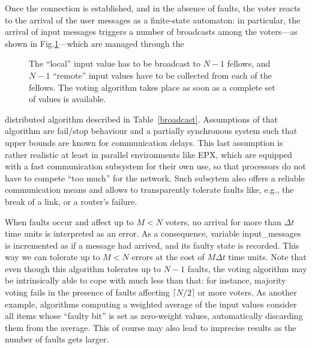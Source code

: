 \documentclass[11pt]{article}
\newcommand{\ceil}[1]{{\lceil{#1}\rceil}}
\begin{document}
Once the connection is established, and in the absence of faults,
the voter reacts to the arrival of 
the user messages as a finite-state automaton: in particular, the arrival of
input messages triggers a number of broadcasts among the voters---as shown
in Fig.\ref{vf}---which are managed through the 
\begin{figure}
\centerline{}
\caption{The ``local'' input value has to be broadcast to $N-1$ fellows,
and $N-1$ ``remote'' input values have to be collected from each of the
fellows. The voting algorithm takes place as soon as a complete set of values is
available.}\label{vf}
\end{figure}
distributed algorithm described in Table~\ref{broadcast}.
Assumptions of that algorithm are fail/stop behaviour and a partially
synchronous system such that upper bounds are known for communication delays.
This last assumption is rather realistic at least in parallel environments like EPX,
which are equipped with a fast communication subsystem for their own use,
so that processors do not have to compete ``too much'' for the network.
Such subsytem also offers a reliable communication means and allows to transparently tolerate 
faults like, e.g., the break of a link, or a router's failure.

When faults occur and affect up to $M<N$ voters,
no arrival for more than $\Delta t$ time units is interpreted
as an error. As a consequence, 
variable {\sf input\_messages} is incremented as if a message
had arrived, and its faulty state is recorded. This way we can tolerate
up to $M<N$ errors at the cost of $M\Delta t$ time units.
Note that even though this algorithm tolerates up to $N-1$ faults,
the voting algorithm may be intrinsically able to cope with much less than that:
for instance, majority voting fails in the presence of faults affecting
$\ceil{N/2}$ or more voters. As another example, algorithms computing
a weighted average of the input values consider all items
whose ``faulty bit'' is set as zero-weight values, automatically
discarding them from the average. This of course may also lead to
imprecise results as the number of faults gets larger.
\end{document}

